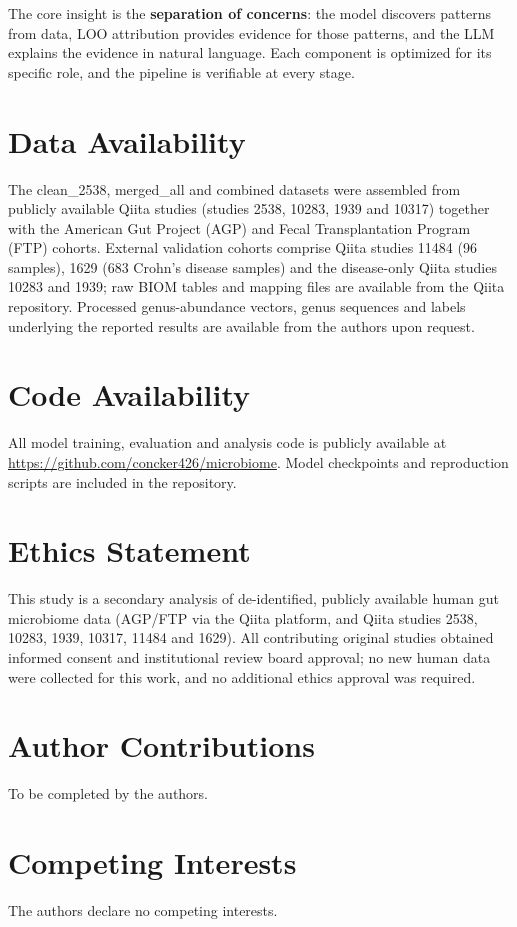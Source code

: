 \documentclass[11pt,a4paper]{article}
\begin{document}
The core insight is the \textbf{separation of concerns}: the model discovers patterns from data, LOO attribution provides evidence for those patterns, and the LLM explains the evidence in natural language. Each component is optimized for its specific role, and the pipeline is verifiable at every stage.

\section*{Data Availability}
The clean\_2538, merged\_all and combined datasets were assembled from publicly available Qiita studies (studies 2538, 10283, 1939 and 10317) together with the American Gut Project (AGP) and Fecal Transplantation Program (FTP) cohorts. External validation cohorts comprise Qiita studies 11484 (96 samples), 1629 (683 Crohn’s disease samples) and the disease-only Qiita studies 10283 and 1939; raw BIOM tables and mapping files are available from the Qiita repository. Processed genus-abundance vectors, genus sequences and labels underlying the reported results are available from the authors upon request.

\section*{Code Availability}
All model training, evaluation and analysis code is publicly available at \url{https://github.com/concker426/microbiome}. Model checkpoints and reproduction scripts are included in the repository.

\section*{Ethics Statement}
This study is a secondary analysis of de-identified, publicly available human gut microbiome data (AGP/FTP via the Qiita platform, and Qiita studies 2538, 10283, 1939, 10317, 11484 and 1629). All contributing original studies obtained informed consent and institutional review board approval; no new human data were collected for this work, and no additional ethics approval was required.

\section*{Author Contributions}
To be completed by the authors.

\section*{Competing Interests}
The authors declare no competing interests.
\end{document}
